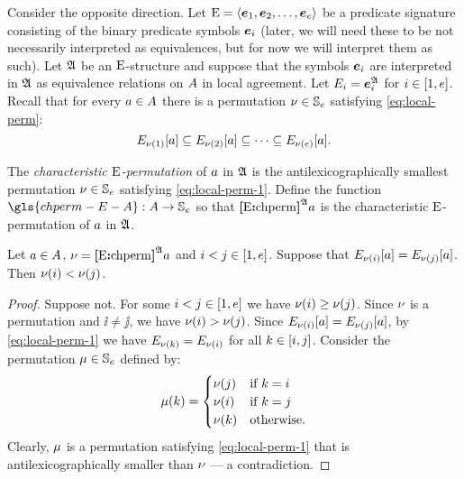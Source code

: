 Consider the opposite direction.
Let ${\mathrm{E}} = \left\langle \bm{e}_{1},\bm{e}_{2},\dots,\bm{e}_{e} \right\rangle$ be a predicate signature consisting
of the binary predicate symbols $\bm{e}_{i}$ (later, we will need these to be
not necessarily interpreted as equivalences, but for now we will interpret
them as such).
Let $\mathfrak{A}$ be an ${\mathrm{E}}$-structure and suppose that the symbols $\bm{e}_{i}$ are
interpreted in $\mathfrak{A}$ as equivalence relations on $A$ in local agreement.
Let $E_{i} = \bm{e}_{i}^{\mathfrak{A}}$ for $i \in [1,e]$.
Recall that for every $a \in A$ there is a permutation
$\nu \in \mathbb{S}_{e}$ satisfying \cref{eq:local-perm}:
\begin{equation}\label{eq:local-perm-1}
  \relEE{\permnu(1)}[\ea] \subseteq
  \relEE{\permnu(2)}[\ea] \subseteq \dots \subseteq
  \relEE{\permnu(\sze)}[\ea].
\end{equation}
\begin{definition}
The \emph{characteristic ${\mathrm{E}}$-permutation} of $a$ in $\mathfrak{A}$ is
the antilexicographically smallest permutation $\nu \in \mathbb{S}_{e}$
satisfying \cref{eq:local-perm-1}.
Define the function $\gls{chperm-E-A} : \domA \to \Perms\sze$ so
that ${\bm{[}{\mathrm{E}}\mathord{\bm{:}}\mathrm{chperm}\bm{]}}^{\mathfrak{A}}a$ is the characteristic ${\mathrm{E}}$-permutation of $a$ in
$\mathfrak{A}$.
\end{definition}
\begin{remark}\label{rem:local-eq-perm}
Let $a \in A$, $\nu = {\bm{[}{\mathrm{E}}\mathord{\bm{:}}\mathrm{chperm}\bm{]}}^{\mathfrak{A}}a$ and
$i < j \in [1,e]$.
Suppose that $E_{\nu(i)}[a] = E_{\nu(j)}[a]$.
Then $\nu(i) < \nu(j)$.
\end{remark}
\begin{proof}
Suppose not. For some $i < j \in [1,e]$ we have
$\nu(i) \geq \nu(j)$.
Since $\nu$ is a permutation and $\ii \neq \jj$,
we have $\nu(i) > \nu(j)$.
Since $E_{\nu(i)}[a] = E_{\nu(j)}[a]$,
by \cref{eq:local-perm-1} we have $E_{\nu(k)} = E_{\nu(i)}$
for all $k \in [i, j]$.
Consider the permutation $\mu \in \mathbb{S}_{e}$ defined by:
\[
  \mu(k) = \begin{cases}
    \nu(j) &\text{if } k = i \\
    \nu(i) &\text{if } k = j \\
    \nu(k) &\text{otherwise.}
  \end{cases}
\]
Clearly, $\mu$ is a permutation satisfying \cref{eq:local-perm-1} that is
antilexicographically smaller than $\nu$ --- a contradiction.
\end{proof}

